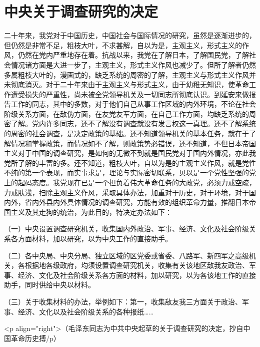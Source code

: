 \section[中央关于调查研究的决定（一九四一年八月一日）]{中央关于调查研究的决定}


二十年来，我党对于中国历史，中国社会与国际情况的研究，虽然是逐渐进步的，但仍然是非常不足，粗枝大叶，不求甚解，自以为是，主观主义，形式主义的作风，仍然在党内严重地存在着。抗战以来，我党在了解日本，了解国民党，了解社会情况诸方面是大进一步了，主观主义，形式主义作风也减少了。但所了解者仍然多属粗枝大叶的，漫画式的，缺乏系统的周密的了解，主观主义与形式主义作风并未彻底消灭。对于二十年来由于主观主义与形式主义，由于幼稚无知识，使革命工作遭受损失的严重性，尚未被全党领导机关及一切同志所彻底认识。到延安来做报告工作的同志，其中的多数，对于他们自己从事工作区域的内外环境，不论在社会阶级关系方面，在敌伪方面，在友党友军方面，在自己工作方面，均缺乏系统的周密了解。党内许多同志，还不了解没有调查就没有发言权这一真理。还不了解系统的周密的社会调查，是决定政策的基础。还不知道领导机关的基本任务，就在于了解情况和掌握政策，而情况如不了解，则政策势必错误，还不知道，不但日本帝国主义对于中国的调查研究，是如何的无微不到就是国民党对于国内外情况，亦此我党所了解的丰富的多。还不知道，粗枝大叶，自以为是的主观主义作风，就是党性不纯的第一个表现，而实事求是，理论与实际密切联系，贝以是一个党性坚强的党上的起码态度。我党现在已是一个担负着伟大革命任务的大政党，必须力戒空疏，力戒肤浅，扫除主观主义作风，采取具体办法，加重对于历史，对于环境，对于国内外，省内外县内外具体情况的调查研究，方能有效的组织革命力量，推翻日本帝国主义及其走狗的统治，为此目的，特决定办法如下：

（一）中央设置调查研究机关，收集国内外政治、军事、经济、文化及社会阶级关系各方面材料，加以研究，以为中央工作的直接助手。

（二）各中央局、中央分局、独立区域的区党委或省委、八路军、新四军之高级机关，各根据地各级政府，均须设置调查研究机关，收集有关该地区敌我友政治、军事、经济、文化及社会阶级关系各方面的材料，加以研究，以为各该地工作的直接助手，同时供给中央以材料。

（三）关于收集材料的办法，举例如下：第一，收集敌友我三方面关于政治、军事、经济、文化以及社会阶级关系的各种报纸……

<p align="right">（毛泽东同志为中共中央起草的关于调查研究的决定，抄自中国革命历史搏/p）


